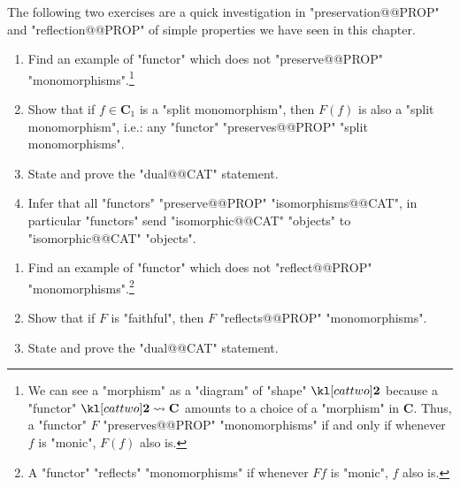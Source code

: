 \documentclass[main.tex]{subfiles}
\begin{document}
The following two exercises are a quick investigation in "preservation@@PROP" and "reflection@@PROP" of simple properties we have seen in this chapter.
\begin{exer}\label{exer:duality:preserving}
	\begin{enumerate}
        \item Find an example of "functor" which does not "preserve@@PROP" "monomorphisms".\footnote{We can see a "morphism" as a "diagram" of "shape" $\cattwo$ because a "functor" $\cattwo \rightsquigarrow \mathbf{C}$ amounts to a choice of a "morphism" in $\mathbf{C}$. Thus, a "functor" $F$ "preserves@@PROP" "monomorphisms" if and only if whenever $f$ is "monic", $F(f)$ also is.}
        \item Show that if $f \in \mathbf{C}_1$ is a "split monomorphism", then $F(f)$ is also a "split monomorphism", i.e.: any "functor" "preserves@@PROP" "split monomorphisms".
        \item State and prove the "dual@@CAT" statement.
        \item Infer that all "functors" "preserve@@PROP" "isomorphisms@@CAT", in particular "functors" send "isomorphic@@CAT" "objects" to "isomorphic@@CAT" "objects".
    \end{enumerate}
\end{exer}
\begin{exer}\label{exer:duality:reflecting}
	\begin{enumerate}
		\item Find an example of "functor" which does not "reflect@@PROP" "monomorphisms".\footnote{A "functor" "reflects" "monomorphisms" if whenever $Ff$ is "monic", $f$ also is.}
		\item Show that if $F$ is "faithful", then $F$ "reflects@@PROP" "monomorphisms".
		\item State and prove the "dual@@CAT" statement.
	\end{enumerate}
\end{exer}
%
\end{document}
